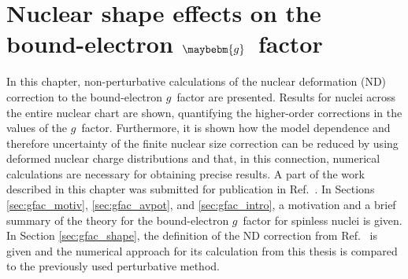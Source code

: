 \chapter{Nuclear shape effects on the bound-electron $\maybebm{g}$~factor}
\label{ch:nucl_def}

In this chapter, non-perturbative calculations of the nuclear deformation (ND) correction to the bound-electron $g$~factor are presented. Results for nuclei across the entire nuclear chart are shown, quantifying the higher-order corrections in the values of the $g$~factor. Furthermore, it is shown how the model dependence and therefore uncertainty of the finite nuclear size correction can be reduced by using deformed nuclear charge distributions and that, in this connection, numerical calculations are necessary for obtaining precise results. A part of the work described in this chapter was submitted for publication in Ref.~\cite{michel_nuclDef}. In Sections \ref{sec:gfac_motiv}, \ref{sec:gfac_avpot}, and \ref{sec:gfac_intro}, a motivation and a brief summary of the theory for the bound-electron $g$~factor for spinless nuclei is given. In Section \ref{sec:gfac_shape}, the definition of the ND correction from Ref.~\cite{jacek2012} is given and the numerical approach for its calculation from this thesis is compared to the previously used perturbative method.

